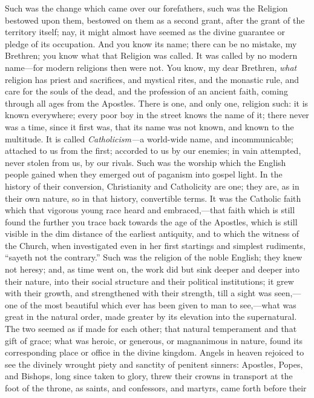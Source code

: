 Such was the change which came over our forefathers,
such was the Religion bestowed upon them, bestowed on
them as a second grant, after the grant of the territory
itself; nay, it might almost have seemed as the divine
guarantee or pledge of its occupation. And you know its
name; there can be no mistake, my Brethren; you know what
that Religion was called. It was called by no modern
name—for modern religions then were not. You know,
my dear Brethren, \emph{what} religion has priest and
sacrifices, and mystical rites, and the monastic rule,
and care for the souls of the dead, and the profession of
an ancient faith, coming through all ages from the
Apostles. There is one, and only one, religion such: it
is known everywhere; every poor boy in the street knows
the name of it; there never was a time, since it first
was, that its name was not known, and known to the
multitude. It is called \emph{Catholicism—}a
world-wide name, and incommunicable; attached to us from
the first; accorded to us by our enemies; in vain
attempted, never stolen from us, by our rivals. Such was
the worship which the English people gained when they
emerged out of paganism into gospel light. In the history
of their conversion, Christianity and Catholicity are
one; they are, as in their own nature, so in that
history, convertible terms. It was the Catholic faith
which that vigorous young race heard and
embraced,—that faith which is still found the
further you trace back towards the age of the Apostles,
which is still visible in the dim distance of the
earliest antiquity, and to which the witness of the
Church, when investigated even in her first startings and
simplest rudiments, ``sayeth not the contrary.''
Such was the religion of the noble English; they knew not
heresy; and, as time went on, the work did but sink
deeper and deeper into their nature, into their social
structure and their political institutions; it grew with
their growth, and strengthened with their strength, till
a sight was seen,—one of the most beautiful which
ever has been given to man to see,—what was great in
the natural order, made greater by its elevation into the
supernatural. The two seemed as if made for each other;
that natural temperament and that gift of grace; what was
heroic, or generous, or magnanimous in nature, found its
corresponding place or office in the divine kingdom.
Angels in heaven rejoiced to see the divinely wrought
piety and sanctity of penitent sinners: Apostles, Popes,
and Bishops, long since taken to glory, threw their
crowns in transport at the foot of the throne, as saints,
and confessors, and martyrs, came forth before their
